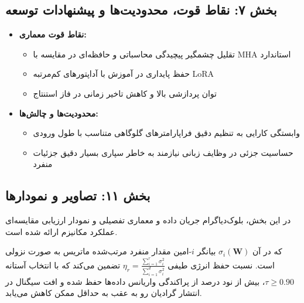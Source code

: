 \subsection*{بخش ۷: نقاط قوت، محدودیت‌ها و پیشنهادات توسعه }
\begin{itemize}
    \item \textbf{نقاط قوت معماری:}
    \begin{itemize}
        \item تقلیل چشمگیر پیچیدگی محاسباتی و حافظه‌ای در مقایسه با MHA استاندارد
        \item حفظ پایداری در آموزش با آداپتورهای کم‌مرتبه LoRA
        \item توان پردازشی بالا و کاهش تاخیر زمانی در فاز استنتاج
    \end{itemize}
    \item \textbf{محدودیت‌ها و چالش‌ها:}
    \begin{itemize}
        \item وابستگی کارایی به تنظیم دقیق فراپارامترهای گلوگاهی متناسب با طول ورودی
        \item حساسیت جزئی در وظایف زبانی نیازمند به خاطر سپاری بسیار دقیق جزئیات منفرد
    \end{itemize}
\end{itemize}

\subsection*{بخش ۱۱: تصاویر و نمودارها }
در این بخش، بلوک‌دیاگرام جریان داده و معماری تفصیلی و نمودار ارزیابی مقایسه‌ای عملکرد مکانیزم  ارائه شده است.



که در آن $\sigma_i(\mathbf{W})$ بیانگر $i$-امین مقدار منفرد مرتب‌شده ماتریس به صورت نزولی است. نسبت حفظ انرژی طیفی $\eta_r = \frac{\sum_{i=1}^r \sigma_i^2}{\sum_{i=1}^{d} \sigma_i^2}$ تضمین می‌کند که با انتخاب آستانه $\tau \ge 0.90$، بیش از نود درصد از پراکندگی واریانس داده‌ها حفظ شده و افت سیگنال در انتشار گرادیان رو به عقب به حداقل ممکن کاهش می‌یابد.

